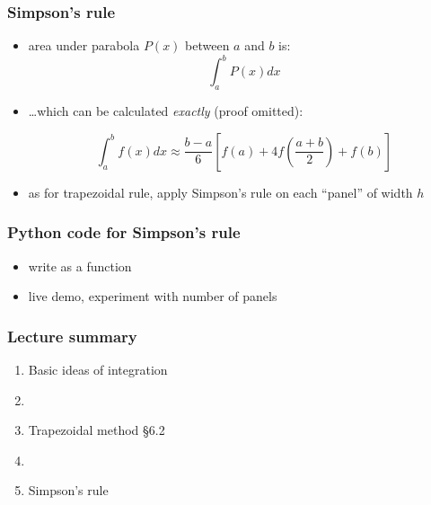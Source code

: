 \documentclass[english,14pt]{beamer}
\newcommand\red[1]{{\color{red} #1}}
\begin{document}
\begin{frame}[fragile]

\frametitle{Simpson's rule}

\begin{itemize}
	\item area under parabola $P(x)$ between $a$ and $b$ is:
\[
\int_a^b P(x) dx
\]
\item[] \ldots which can be calculated \emph{exactly} (proof omitted):

\[
\int_a^b f(x)dx \approx \frac{b-a}{6} \left[ f(a) + 4f\left(\frac{a+b}{2}\right) + f(b)\right]
\]
\item as for trapezoidal rule, apply Simpson's rule on each ``panel'' of width $h$ %
\end{itemize}

\end{frame}


\begin{frame}[fragile]

\frametitle{Python code for Simpson's rule}

\begin{itemize}
	\item write as a function
	\item live demo, experiment with number of panels
\end{itemize}

\end{frame}


\begin{frame}[fragile]

\frametitle{Lecture summary}

\begin{enumerate}
	\item Basic ideas of integration
	
	\item[]
	
	\item Trapezoidal method \red{\S6.2}
	
%	
	
	\item[]
	
	\item Simpson's rule
	
\end{enumerate}

\end{frame}
\end{document}
